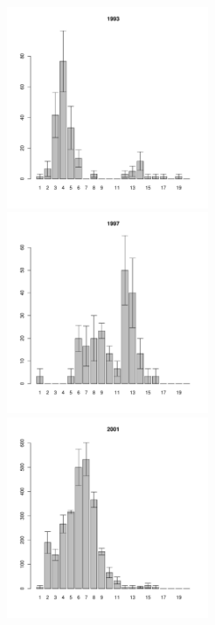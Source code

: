 \documentclass[12pt, a4paper]{article}
\begin{document}
\begin{figure}[h]
\begin{multicols}{3}
\hfill
\includegraphics[width=60mm]{../White_Sea/Estuatiy_Luvenga/sizestr_1993_.pdf}
\hfill
\includegraphics[width=60mm]{../White_Sea/Estuatiy_Luvenga/sizestr_1997_.pdf}
\hfill
\includegraphics[width=60mm]{../White_Sea/Estuatiy_Luvenga/sizestr_2001_.pdf}
\end{multicols}



\end{figure}
\end{document}
